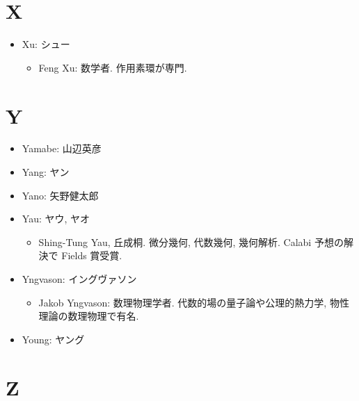 \documentclass[openany, a4paper, oneside]{jsbook}
\begin{document}
\section{X}

\begin{itemize}
\item Xu: シュー
\begin{itemize}
\item Feng Xu: 数学者. 作用素環が専門.
\end{itemize}
\end{itemize}
\section{Y}

\begin{itemize}
\item Yamabe: 山辺英彦
\item Yang: ヤン
\item Yano: 矢野健太郎
\item Yau: ヤウ, ヤオ
\begin{itemize}
\item Shing-Tung Yau, 丘成桐. 微分幾何, 代数幾何, 幾何解析. Calabi 予想の解決で Fields 賞受賞.
\end{itemize}
\item Yngvason: イングヴァソン
\begin{itemize}
\item Jakob Yngvason: 数理物理学者. 代数的場の量子論や公理的熱力学, 物性理論の数理物理で有名.
\end{itemize}
\item Young: ヤング
\end{itemize}
\section{Z}
\end{document}
